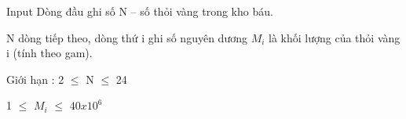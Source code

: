 Input
Dòng đầu ghi số N – số thỏi vàng trong kho báu.


N dòng tiếp theo, dòng thứ i ghi số nguyên dương $M_{i}$ là khối lượng của thỏi vàng i (tính theo gam).

Giới hạn : 2  $\le$  N  $\le$  24

1  $\le$  $M_{i}$  $\le$  $40x10^{6}$